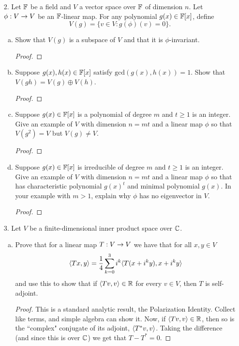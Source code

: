 \begin{itemize}
\item[2.] Let $\mathbb{F}$ be a field and $V$ a vector space over $\mathbb{F}$ of dimension $n$. Let $\phi : V \rightarrow V$ be
an $\mathbb{F}$-linear map. For any polynomial $g(x) \in \mathbb{F}[x]$, define
$$V(g) = \{ v \in V : g(\phi)(v) = 0\}.$$
\begin{enumerate}[(a)]
\item Show that $V (g)$ is a subspace of $V$ and that it is $\phi$-invariant.
\begin{proof}

\end{proof}

\item Suppose $g(x), h(x) \in \mathbb{F}[x]$ satisfy $\text{gcd}(g(x), h(x)) = 1$. Show that $V (gh) = V (g) \oplus V (h)$.
\begin{proof}

\end{proof}

\item Suppose $g(x) \in \mathbb{F}[x]$ is a polynomial of degree $m$ and $t \geq 1$ is an
integer. Give an example of $V$ with dimension $n = mt$ and a linear map $\phi$ so
that $V (g^2) = V$ but $V (g) \neq V$.
\begin{proof}

\end{proof}

\item Suppose $g(x) \in \mathbb{F}[x]$ is irreducible of degree $m$ and $t \geq 1$ is an
integer. Give an example of $V$ with dimension $n = mt$ and a linear map $\phi$ so
that has characteristic polynomial $g(x)^t$ and minimal polynomial $g(x)$. In your example with $m > 1$, explain why $\phi$ has no eigenvector in $V$.
\begin{proof}

\end{proof}
\end{enumerate}





\item[3.] Let $V$ be a finite-dimensional inner product space over $\mathbb{C}$.
\begin{enumerate}[(a)]
\item Prove that for a linear map $T : V \rightarrow V$ we have that for all $x, y \in V$
$$\langle{}Tx,y\rangle = \frac{1}{4} \sum_{k=0}^3 i^k \langle{}T(x+i^k y),x+i^k y\rangle$$
and use this to show that if $\langle{}Tv,v\rangle \in \mathbb{R}$ for every $v \in V$, then $T$ is self-adjoint.
\begin{proof}
    This is a standard analytic result, the Polarization Identity. Collect like terms, and simple algebra can show it. Now, if $\langle{}Tv,v\rangle \in \mathbb{R}$, then so is the ``complex" conjugate of its adjoint, $\langle{}T^* v,v\rangle$. Taking the difference (and since this is over $\mathbb{C}$) we get that $T - T^* = 0$.
\end{proof}


\end{enumerate}
\end{itemize}
